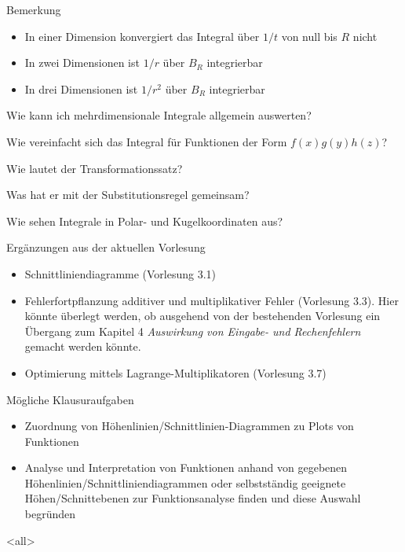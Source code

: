 \begin{frame}{Bemerkung}
  \begin{itemize}
  \item In einer Dimension konvergiert das Integral über  $1/t$ von null bis $R$ nicht
  \item In zwei Dimensionen ist $1/r$ über $B_R$ integrierbar
  \item In drei Dimensionen ist $1/r^2$ über $B_R$ integrierbar
  \end{itemize}
\end{frame}

\begin{Abschluss}
\item Wie kann ich mehrdimensionale Integrale allgemein auswerten?
\item Wie vereinfacht sich das Integral für Funktionen der Form $f(x)g(y)h(z)$?
\item Wie lautet der Transformationssatz?
\item Was hat er mit der Substitutionsregel gemeinsam?
\item Wie sehen Integrale in Polar- und Kugelkoordinaten aus?
\end{Abschluss}

\begin{envmrerror}{Ergänzungen aus der aktuellen Vorlesung}
\begin{itemize}
    \item Schnittliniendiagramme (Vorlesung 3.1)
    \item Fehlerfortpflanzung additiver und multiplikativer Fehler (Vorlesung 3.3). Hier könnte überlegt werden, ob ausgehend von der bestehenden Vorlesung ein Übergang zum Kapitel 4 \textit{Auswirkung von Eingabe- und Rechenfehlern} gemacht werden könnte.
    \item Optimierung mittels Lagrange-Multiplikatoren (Vorlesung 3.7)
\end{itemize}
\end{envmrerror}

\begin{envmrnote}{Mögliche Klausuraufgaben}
\begin{itemize}
    \item Zuordnung von Höhenlinien/Schnittlinien-Diagrammen zu Plots von Funktionen
    \item Analyse und Interpretation von Funktionen anhand von gegebenen Höhenlinien/Schnittliniendiagrammen oder selbstständig geeignete Höhen/Schnittebenen zur Funktionsanalyse finden und diese Auswahl begründen
\end{itemize}
\end{envmrnote}

  

\mode<all>
